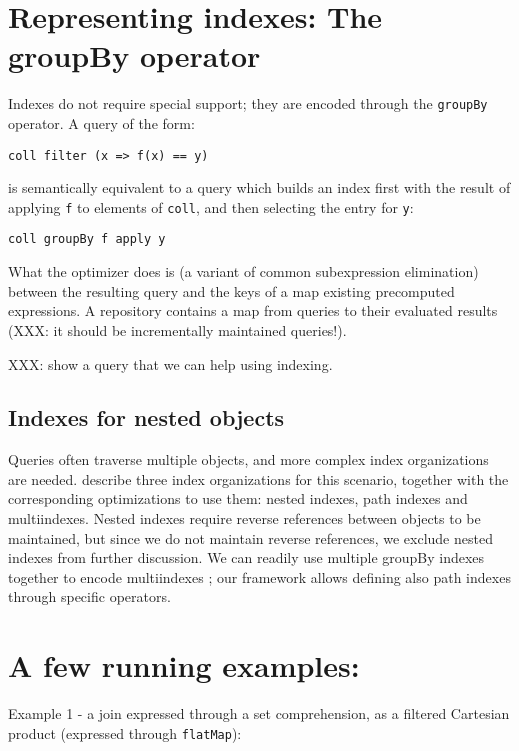\documentclass{article}
\begin{document}
\section{Representing indexes: The groupBy operator}

Indexes do not require special support; they are encoded through the
\texttt{groupBy} operator. A query of the form:

\begin{verbatim}
coll filter (x => f(x) == y)
\end{verbatim}
is semantically equivalent to a query which builds an index first with
the result of applying \texttt{f} to elements of \texttt{coll}, and then
selecting the entry for \texttt{y}:

\begin{verbatim}
coll groupBy f apply y
\end{verbatim}
What the optimizer does is (a variant of common subexpression
elimination) between the resulting query and the keys of a map existing
precomputed expressions. A repository contains a map from queries to
their evaluated results (XXX: it should be incrementally maintained
queries!).

XXX: show a query that we can help using indexing.

\subsection{Indexes for nested objects}

Queries often traverse multiple objects, and more complex index
organizations are needed. \citet{Bertino89} describe three index
organizations for this scenario, together with the corresponding
optimizations to use them: nested indexes, path indexes and
multiindexes. Nested indexes require reverse references between objects
to be maintained, but since we do not maintain reverse references, we
exclude nested indexes from further discussion. We can readily use
multiple groupBy indexes together to encode multiindexes
\citep{Bertino89}; our framework allows defining also path indexes
through specific operators.

\section{A few running examples:}

Example 1 - a join expressed through a set comprehension, as a filtered
Cartesian product (expressed through \texttt{flatMap}):
\end{document}
